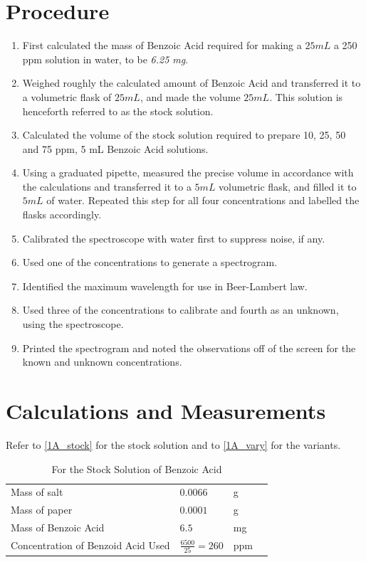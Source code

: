 \section{Procedure}
	\begin{enumerate}
		\item First calculated the mass of Benzoic Acid required for making a $25 mL$ a 250 ppm solution in water, to be \emph{6.25 mg}. 
		\item Weighed roughly the calculated amount of Benzoic Acid and transferred it to a volumetric flask of $25 mL$, and made the volume $25 mL$. This solution is henceforth referred to as the stock solution.
		\item Calculated the volume of the stock solution required to prepare 10, 25, 50 and 75 ppm, 5 mL Benzoic Acid solutions.
		\item Using a graduated pipette, measured the precise volume in accordance with the calculations and transferred it to a $5 mL$ volumetric flask, and filled it to $5 mL$ of water. Repeated this step for all four concentrations and labelled the flasks accordingly.
		\item Calibrated the spectroscope with water first to suppress noise, if any.
		\item Used one of the concentrations to generate a spectrogram.
		\item Identified the maximum wavelength for use in Beer-Lambert law.
		\item Used three of the concentrations to calibrate and fourth as an unknown, using the spectroscope.
		\item Printed the spectrogram and noted the observations off of the screen for the known and unknown concentrations.
	\end{enumerate}

\section{Calculations and Measurements}
	Refer to \autoref{1A_stock} for the stock solution and to \autoref{1A_vary} for the variants.

	\begin{table}
		\myfloatalign
		\begin{tabularx}{\textwidth}{Xlll}
			\hline%
			Mass of salt 						& 	$0.0066$	& 	g\\
			Mass of paper 						& 	$0.0001$	& 	g\\
			Mass of Benzoic Acid				& 	$6.5$		&	mg\\
			Concentration of Benzoid Acid Used 	& 	$\frac{6500}{25}=260$ & ppm\\
			\hline%
		\end{tabularx}
		\caption{For the Stock Solution of Benzoic Acid}
		\label{1A_stock}
	\end{table}

